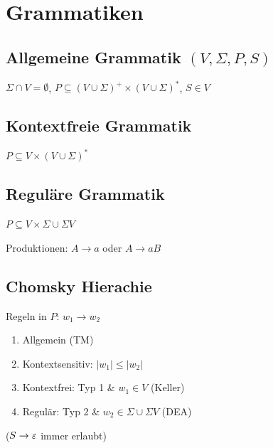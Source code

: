 \section*{Grammatiken}

\subsection*{Allgemeine Grammatik $(V,\Sigma,P,S)$}
$\Sigma \cap V = \emptyset$, $P \subseteq (V \cup \Sigma)^+ \times (V \cup \Sigma)^*$, $S \in V$

\subsection*{Kontextfreie Grammatik}
$P \subseteq V \times (V \cup \Sigma)^*$

\subsection*{Reguläre Grammatik}
$P \subseteq V \times \Sigma \cup \Sigma V$

Produktionen: $A \to a$ oder $A \to aB$

\subsection*{Chomsky Hierachie}
Regeln in $P$: $w_1 \to w_2$
\begin{enumerate}[start=0]
	\item Allgemein (TM)
	\item Kontextsensitiv: $|w_1| \le |w_2|$
	\item Kontextfrei: Typ 1 \& $w_1 \in V$ (Keller)
	\item Regulär: Typ 2 \& $w_2 \in \Sigma \cup \Sigma V$ (DEA)
\end{enumerate}
($S \to \varepsilon$ immer erlaubt)
